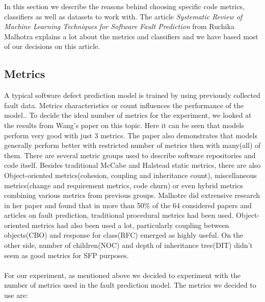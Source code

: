 In this section we describe the reasons behind choosing specific code metrics, classifiers as well as datasets to work with. The article \textit{Systematic Review of Machine Learning Techniques for Software Fault Prediction}\cite{malhotra2015systematic} from Ruchika Malhotra explains a lot about the metrics and classifiers and we have based most of our decisions on this article.
\subsection{Metrics}
A typical software defect prediction model is trained by using previously collected fault data. Metrics characteristics or count influences the performance of the model.\cite{wang2011many}. To decide the ideal number of metrics for the experiment, we looked at the results from Wang's paper on this topic\cite{wang2011many}. Here it can be seen that models perform very good with just 3 metrics. The paper also demonstrates that models generally perform better with restricted number of metrics then with many(all) of them. There are several metric groups used to describe software repositories and code itself. Besides traditional McCabe and Halstead static metrics, there are also Object-oriented metrics(cohesion, coupling and inheritance count), miscellaneous metrics(change and requirement metrics, code churn) or even hybrid metrics combining various metrics from previous groups. Malhotre did extrensive research in her paper and found that in more than 50\% of the 64 considered papers and articles on fault prediction, traditional procedural metrics had been used. Object-oriented metrics had also been used a lot\cite{radjenovic2013software}, particularly coupling between objects(CBO) and response for class(RFC) emerged as highly useful. On the other side, number of children(NOC) and depth of inheritance tree(DIT) didn't seem as good metrics for SFP purposes\cite[p.~15]{malhotra2015systematic}.\\\\
For our experiment, as mentioned above we decided to experiment with the number of metrics used in the fault prediction model. The metrics we decided to use are:\\
